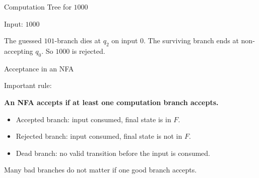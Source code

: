 \documentclass[10pt,aspectratio=169]{beamer}
\begin{document}
\begin{frame}{Computation Tree for \(1000\)}

\small
Input: \(1000\)

\begin{center}
\end{center}

\vspace{0.3em}

The guessed \(101\)-branch dies at \(q_2\) on input \(0\).  
The surviving branch ends at non-accepting \(q_0\). So \(1000\) is rejected.

\end{frame}

\begin{frame}{Acceptance in an NFA}

Important rule:

\vspace{0.8em}

\begin{center}
\textbf{An NFA accepts if at least one computation branch accepts.}
\end{center}

\vspace{0.8em}

\begin{itemize}
\item Accepted branch: input consumed, final state is in \(F\).
\item Rejected branch: input consumed, final state is not in \(F\).
\item Dead branch: no valid transition before the input is consumed.
\end{itemize}

\vspace{0.5em}

\pause
Many bad branches do not matter if one good branch accepts.

\end{frame}
\end{document}
